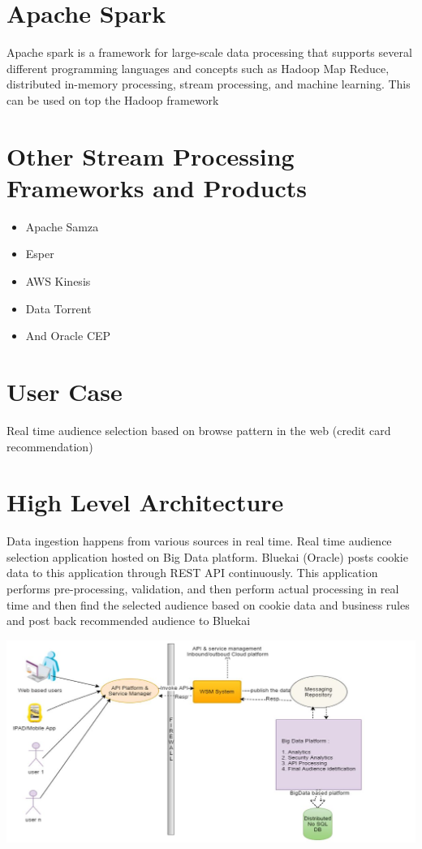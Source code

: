 \section {Apache Spark}
Apache spark is a framework for large-scale data processing that supports several different
programming languages and concepts such as Hadoop Map Reduce, distributed in-memory processing, 
stream processing, and machine learning. This can be used on top the Hadoop framework

\section {Other Stream Processing Frameworks and Products}

\begin{itemize}
\item Apache Samza
\item Esper 
\item AWS Kinesis 
\item Data Torrent 
\item And Oracle CEP 
\end{itemize}


\section {User Case}
Real time audience selection based on browse pattern in the web (credit card recommendation)

\section {High Level Architecture}
Data ingestion happens from various sources in real time. Real time audience selection application hosted on Big Data platform.
Bluekai (Oracle) posts cookie data to this application through REST API continuously. This application performs pre-processing, 
validation, and then perform actual processing in real time and then find the selected 
audience based on cookie data and business rules and post back recommended audience to Bluekai

\centering\includegraphics[width=\columnwidth]{images/realTimeAudienceSelection.JPG}

